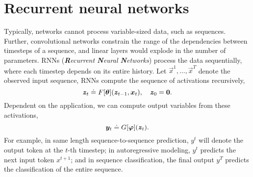 \section{Recurrent neural networks}

Typically, networks cannot process variable-sized data, such as sequences. Further, convolutional
networks constrain the range of the dependencies between timesteps of a sequence, and linear layers
would explode in the number of parameters. RNNs (\textit{\textbf{R}ecurrent \textbf{N}eural
    \textbf{N}etworks}) process the data sequentially, where each timestep depends on its entire
history. Let $\vec{x}^1, \ldots, \vec{x}^T$ denote the observed input sequence, RNNs compute the
sequence of activations recursively, \[
    \vec{z}_t \doteq F[\vec{\theta}]\lft( \vec{z}_{t-1}, \vec{x}_t \rgt), \quad \vec{z}_0 = \vec{0}.
\]
Dependent on the application, we can compute output variables from these activations, \[
    \vec{y}_t \doteq G[\vec{\varphi}]\lft( \vec{z}_t \rgt).
\]
For example, in same length sequence-to-sequence prediction, $y^t$ will denote the output token at
the $t$-th timestep; in autoregressive modeling, $y^t$ predicts the next input token $x^{t+1}$; and
in sequence classification, the final output $y^T$ predicts the classification of the entire
sequence.


